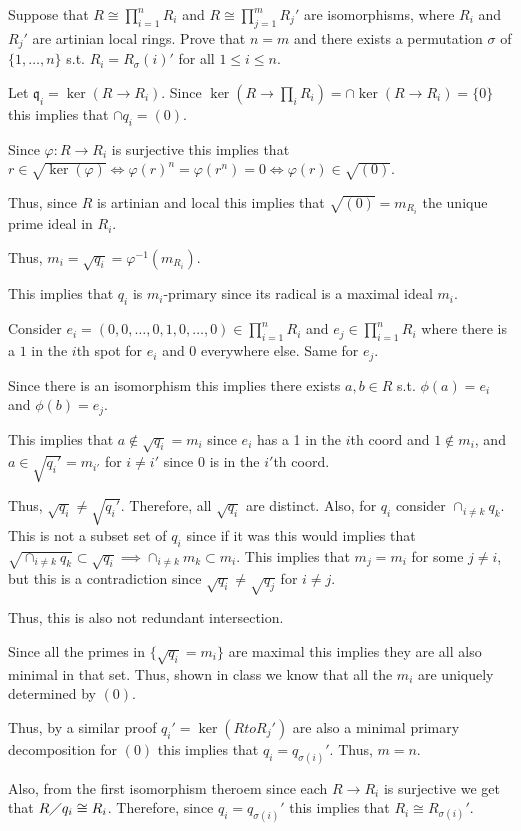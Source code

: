 \documentclass[12pt, letterpaper]{article}
\newcommand{\mf}[1]{\mathfrak{#1}}
\begin{document}
\begin{subproblem}{}
    Suppose that $R \cong \prod_{i=1}^n R_i$ and $R \cong \prod_{j=1}^m R_j'$ are isomorphisms, where $R_i$ and $R_j'$ are artinian local rings.
    Prove that $n=m$ and there exists a permutation $\sigma$ of $\{1,\dots,n\}$ s.t. $R_i = R_\sigma(i)'$ for all $1 \leq i \leq n$.
\end{subproblem}
\begin{problemproof}
    Let $\mf{q}_i = \ker(R \to R_i)$. Since $\ker(R \to \prod_i R_i) = \cap \ker(R \to R_i) = \{0\}$ this implies that $\cap q_i = (0)$.

    Since $\varphi : R \to R_i$ is surjective this implies that $r \in \sqrt{\ker(\varphi)} \iff \varphi(r)^n=\varphi(r^n)=0 \iff \varphi(r) \in \sqrt{(0)}$.

    Thus, since $R$ is artinian and local this implies that $\sqrt{(0)}=m_{R_i}$ the unique prime ideal in $R_i$.

    Thus, $m_i = \sqrt{q_i} = \varphi^{-1}(m_{R_i})$.

    This implies that $q_i$ is $m_i$-primary since its radical is a maximal ideal $m_i$.

    Consider $e_i = (0,0,\dots,0,1,0,\dots,0) \in \prod_{i=1}^n R_i$ and $e_j \in \prod_{i=1}^n R_i$ where there is a $1$ in the $i$th spot for $e_i$ and 0 everywhere else. Same for $e_j$.

    Since there is an isomorphism this implies there exists $a,b \in R$ s.t. $\phi(a)=e_i$ and $\phi(b)=e_j$.

    This implies that $a \notin \sqrt{q_i}=m_i$ since $e_i$ has a 1 in the $i$th coord and $1 \notin m_i$, and $a \in \sqrt{q_i'}=m_{i'}$ for $i \neq i'$ since $0$ is in the $i'$th coord.

    Thus, $\sqrt{q_i} \neq \sqrt{q_i'}$. Therefore, all $\sqrt{q_i}$ are distinct.
    Also, for $q_i$ consider $\cap_{i \neq k} q_k$. This is not a subset set of $q_i$ since if it was this would implies that $\sqrt{\cap_{i \neq k} q_k} \subset \sqrt{q_i} \implies \cap_{i \neq k} m_k \subset m_i$. This implies that $m_j = m_i$ for some $j \neq i$, but this is a contradiction since $\sqrt{q_i} \neq \sqrt{q_j}$ for $i \neq j$.

    Thus, this is also not redundant intersection.

    Since all the primes in $\{\sqrt{q_i} = m_i\}$ are maximal this implies they are all also minimal in that set. Thus, shown in class we know that all the $m_i$ are uniquely determined by $(0)$.

    Thus, by a similar proof $q_i' = \ker(R to R_j')$ are also a minimal primary decomposition for $(0)$ this implies that $q_i = q_{\sigma(i)}'$. Thus, $m=n$.
    
    Also, from the first isomorphism theroem since each $R \to R_i$ is surjective we get that $R \diagup q_i \cong R_i$. Therefore, since $q_i = q_{\sigma(i)}'$ this implies that $R_i \cong R_{\sigma(i)}'$.
\end{problemproof}
\end{document}
